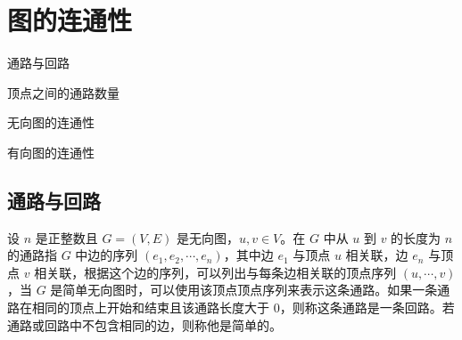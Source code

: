 \section{图的连通性}
\begin{introduction}
    \item 通路与回路
    \item 顶点之间的通路数量
    \item 无向图的连通性
    \item 有向图的连通性
\end{introduction}

\subsection{通路与回路}

\begin{definition}[无向图的通路与回路]\label{def:无向图的通路与回路}
    设 $n$ 是正整数且 $G=(V,E)$ 是无向图，$u,v \in V$。在 $G$ 中从 $u$ 到 $v$ 的长度为 $n$ 的通路指 $G$ 中边的序列 $(e_1,e_2,\cdots,e_n)$，其中边 $e_1$ 与顶点 $u$ 相关联，边 $e_n$ 与顶点 $v$ 相关联，根据这个边的序列，可以列出与每条边相关联的顶点序列 $(u,\cdots,v)$，当 $G$ 是简单无向图时，可以使用该顶点顶点序列来表示这条通路。如果一条通路在相同的顶点上开始和结束且该通路长度大于 $0$，则称这条通路是一条回路。若通路或回路中不包含相同的边，则称他是简单的。
\end{definition}

